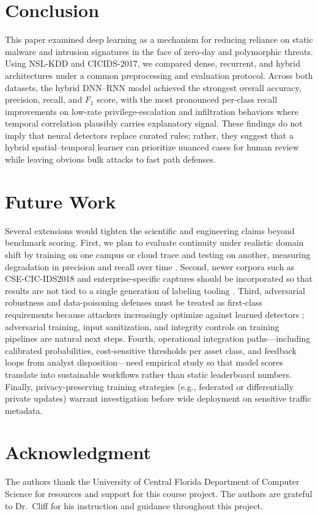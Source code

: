 \documentclass[10pt, conference, compsocconf, letterpaper, twocolumn, twoside]{IEEEtran}
\begin{document}
\section{Conclusion}
This paper examined deep learning as a mechanism for reducing reliance on static malware and intrusion signatures in the face of zero-day and polymorphic threats. Using NSL-KDD and CICIDS-2017, we compared dense, recurrent, and hybrid architectures under a common preprocessing and evaluation protocol. Across both datasets, the hybrid DNN--RNN model achieved the strongest overall accuracy, precision, recall, and $F_1$ score, with the most pronounced per-class recall improvements on low-rate privilege-escalation and infiltration behaviors where temporal correlation plausibly carries explanatory signal. These findings do not imply that neural detectors replace curated rules; rather, they suggest that a hybrid spatial--temporal learner can prioritize nuanced cases for human review while leaving obvious bulk attacks to fast path defenses.

\section{Future Work}
Several extensions would tighten the scientific and engineering claims beyond benchmark scoring. First, we plan to evaluate continuity under realistic domain shift by training on one campus or cloud trace and testing on another, measuring degradation in precision and recall over time \cite{sommer2010}. Second, newer corpora such as CSE-CIC-IDS2018 and enterprise-specific captures should be incorporated so that results are not tied to a single generation of labeling tooling \cite{hindy2020}. Third, adversarial robustness and data-poisoning defenses must be treated as first-class requirements because attackers increasingly optimize against learned detectors \cite{biggio2018,yuan2019}; adversarial training, input sanitization, and integrity controls on training pipelines are natural next steps. Fourth, operational integration paths---including calibrated probabilities, cost-sensitive thresholds per asset class, and feedback loops from analyst disposition---need empirical study so that model scores translate into sustainable workflows rather than static leaderboard numbers. Finally, privacy-preserving training strategies (e.g., federated or differentially private updates) warrant investigation before wide deployment on sensitive traffic metadata.

\section*{Acknowledgment}
The authors thank the University of Central Florida Department of Computer Science for resources and support for this course project. The authors are grateful to Dr.~Cliff for his instruction and guidance throughout this project.
\end{document}
